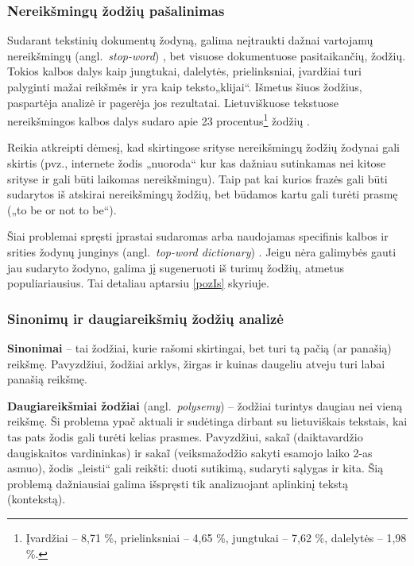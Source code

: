 \documentclass{VUMIFInfKursinis}
\newcommand{\ltang}[2]{#1 (angl.\  \textit{#2}) }
\begin{document}
\subsubsection{Nereikšmingų žodžių pašalinimas}

Sudarant tekstinių dokumentų žodyną, galima neįtraukti dažnai vartojamų
\ltang{nereikšmingų}{stop-word}, bet visuose dokumentuose
pasitaikančių, žodžių. Tokios kalbos dalys kaip jungtukai, dalelytės,
prielinksniai, įvardžiai turi palyginti mažai reikšmės ir yra kaip
teksto„klijai“. Išmetus šiuos žodžius, paspartėja analizė ir pagerėja
jos rezultatai. Lietuviškuose tekstuose nereikšmingos kalbos dalys
sudaro apie 23 procentus\footnote{Įvardžiai – 8,71 \%, prielinksniai –
  4,65 \%, jungtukai – 7,62 \%, dalelytės – 1,98 \%.} žodžių \cite{utka2009davzninis}.

Reikia atkreipti dėmesį, kad skirtingose srityse nereikšmingų žodžių
žodynai gali skirtis (pvz., internete žodis „nuoroda“ kur kas dažniau
sutinkamas nei kitose srityse ir gali būti laikomas nereikšmingu). Taip
pat kai kurios frazės gali būti sudarytos iš atskirai nereikšmingų
žodžių, bet būdamos kartu gali turėti prasmę („to be or not to be“).

Šiai problemai spręsti įprastai sudaromas arba naudojamas specifinis
kalbos ir srities \ltang{žodynų junginys}{top-word dictionary}.
Jeigu nėra galimybės gauti jau sudaryto žodyno, galima jį sugeneruoti iš
turimų žodžių, atmetus populiariausius. Tai detaliau aptarsiu \ref{pozIs} skyriuje.






\subsubsection{Sinonimų ir daugiareikšmių žodžių analizė}

\textbf{Sinonimai} – tai žodžiai, kurie rašomi skirtingai, bet turi tą
pačią (ar panašią) reikšmę. Pavyzdžiui, žodžiai arklys, žirgas ir kuinas
daugeliu atveju turi labai panašią reikšmę.

\ltang{\textbf{Daugiareikšmiai žodžiai}}{polysemy} – žodžiai
turintys daugiau nei vieną reikšmę. Ši problema ypač aktuali ir
sudėtinga dirbant su lietuviškais tekstais, kai tas pats žodis gali
turėti kelias prasmes. Pavyzdžiui, sakaĩ (daiktavardžio daugiskaitos
vardininkas) ir sakaĩ (veiksmažodžio sakyti esamojo laiko 2-as asmuo),
žodis „leisti“ gali reikšti: duoti sutikimą, sudaryti sąlygas ir kita.
Šią problemą dažniausiai galima išspręsti tik analizuojant aplinkinį
tekstą (kontekstą).
\end{document}

